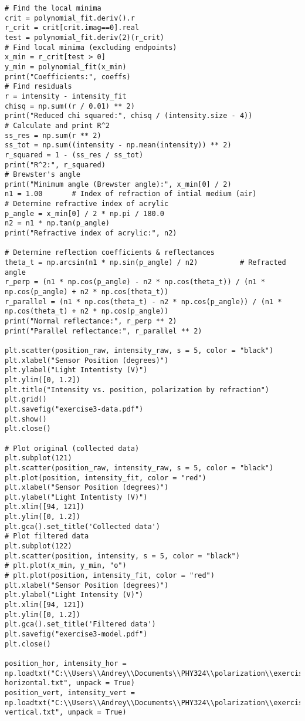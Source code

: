 \begin{lstlisting}
# Find the local minima
crit = polynomial_fit.deriv().r
r_crit = crit[crit.imag==0].real
test = polynomial_fit.deriv(2)(r_crit)
# Find local minima (excluding endpoints)
x_min = r_crit[test > 0]
y_min = polynomial_fit(x_min)
print("Coefficients:", coeffs)
# Find residuals
r = intensity - intensity_fit
chisq = np.sum((r / 0.01) ** 2)
print("Reduced chi squared:", chisq / (intensity.size - 4))
# Calculate and print R^2
ss_res = np.sum(r ** 2)
ss_tot = np.sum((intensity - np.mean(intensity)) ** 2)
r_squared = 1 - (ss_res / ss_tot)
print("R^2:", r_squared)
# Brewster's angle
print("Minimum angle (Brewster angle):", x_min[0] / 2)
n1 = 1.00       # Index of refraction of intial medium (air)
# Determine refractive index of acrylic
p_angle = x_min[0] / 2 * np.pi / 180.0
n2 = n1 * np.tan(p_angle)
print("Refractive index of acrylic:", n2)

# Determine reflection coefficients & reflectances
theta_t = np.arcsin(n1 * np.sin(p_angle) / n2)          # Refracted angle
r_perp = (n1 * np.cos(p_angle) - n2 * np.cos(theta_t)) / (n1 * np.cos(p_angle) + n2 * np.cos(theta_t))
r_parallel = (n1 * np.cos(theta_t) - n2 * np.cos(p_angle)) / (n1 * np.cos(theta_t) + n2 * np.cos(p_angle))
print("Normal reflectance:", r_perp ** 2)
print("Parallel reflectance:", r_parallel ** 2)

plt.scatter(position_raw, intensity_raw, s = 5, color = "black")
plt.xlabel("Sensor Position (degrees)")
plt.ylabel("Light Intentisty (V)")
plt.ylim([0, 1.2])
plt.title("Intensity vs. position, polarization by refraction")
plt.grid()
plt.savefig("exercise3-data.pdf")
plt.show()
plt.close()

# Plot original (collected data)
plt.subplot(121)
plt.scatter(position_raw, intensity_raw, s = 5, color = "black")
plt.plot(position, intensity_fit, color = "red")
plt.xlabel("Sensor Position (degrees)")
plt.ylabel("Light Intentisty (V)")
plt.xlim([94, 121])
plt.ylim([0, 1.2])
plt.gca().set_title('Collected data')
# Plot filtered data
plt.subplot(122)
plt.scatter(position, intensity, s = 5, color = "black")
# plt.plot(x_min, y_min, "o")
# plt.plot(position, intensity_fit, color = "red")
plt.xlabel("Sensor Position (degrees)")
plt.ylabel("Light Intensity (V)")
plt.xlim([94, 121])
plt.ylim([0, 1.2])
plt.gca().set_title('Filtered data')
plt.savefig("exercise3-model.pdf")
plt.close()

position_hor, intensity_hor = np.loadtxt("C:\\Users\\Andrey\\Documents\\PHY324\\polarization\\exercise3-horizontal.txt", unpack = True)
position_vert, intensity_vert = np.loadtxt("C:\\Users\\Andrey\\Documents\\PHY324\\polarization\\exercise3-vertical.txt", unpack = True)


\end{lstlisting}
